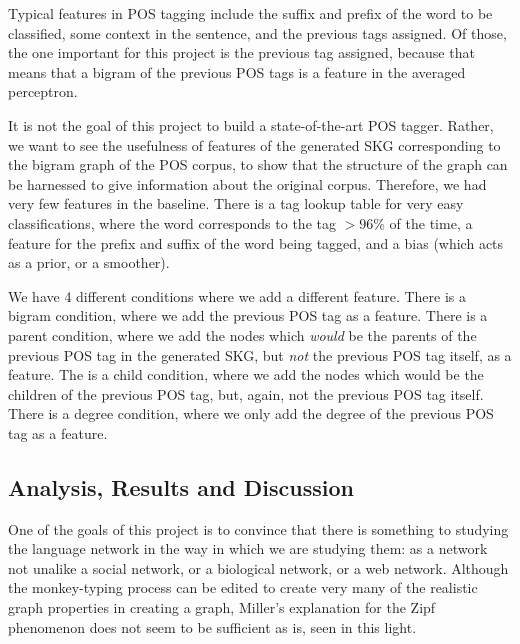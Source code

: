 \documentclass[12pt]{article}
\begin{document}
Typical features in POS tagging include the suffix and prefix of the word to be classified, some context in the sentence, and the previous tags assigned. Of those, the one important for this project is the previous tag assigned, because that means that a bigram of the previous POS tags is a feature in the averaged perceptron. %

It is not the goal of this project to build a state-of-the-art POS tagger. Rather, we want to see the usefulness of features of the generated SKG corresponding to the bigram graph of the POS corpus, to show that the structure of the graph can be harnessed to give information about the original corpus. Therefore, we had very few features in the baseline. There is a tag lookup table for very easy classifications, where the word corresponds to the tag $>96\%$ of the time, a feature for the prefix and suffix of the word being tagged, and a bias (which acts as a prior, or a smoother).



We have 4 different conditions where we add a different feature. There is a bigram condition, where we add the previous POS tag as a feature. There is a parent condition, where we add the nodes which \emph{would} be the parents of the previous POS tag in the generated SKG, but \emph{not} the previous POS tag itself, as a feature. The is a child condition, where we add the nodes which would be the children of the previous POS tag, but, again, not the previous POS tag itself. There is a degree condition, where we only add the degree of the previous POS tag as a feature. %

\subsection*{Analysis, Results and Discussion}

One of the goals of this project is to convince that there is something to studying the language network in the way in which we are studying them: as a network not unalike a social network, or a biological network, or a web network. Although the monkey-typing process can be edited to create very many of the realistic graph properties in creating a graph, Miller's explanation for the Zipf phenomenon does not seem to be sufficient as is, seen in this light.
\end{document}
